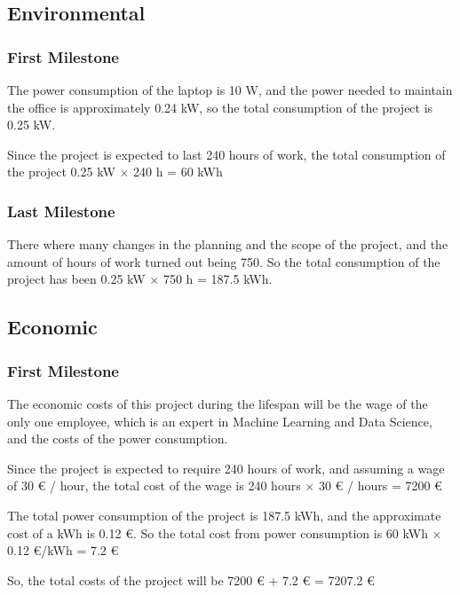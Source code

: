     \subsection{Environmental}
      \subsubsection*{First Milestone}

      The power consumption of the laptop is 10 W, and the power needed to maintain the
      office is approximately 0.24 kW, so the total consumption of the project is
      0.25 kW.

      Since the project is expected to last 240 hours of work, the total consumption of
      the project 0.25 kW $\times$ 240 h = 60 kWh


      \subsubsection*{Last Milestone}

      There where many changes in the planning and the scope of the project,
      and the amount of hours of work turned out being 750. So the total consumption
      of the project has been 0.25 kW $\times$ 750 h = 187.5 kWh.

    \subsection{Economic}
      \subsubsection*{First Milestone}

      The economic costs of this project during the lifespan will be the
      wage of the only one employee, which is an expert in Machine Learning
      and Data Science, and the costs of the power consumption.

      Since the project is expected to require 240 hours of work, and assuming
      a wage of 30 € / hour, the total cost of the wage is
      240 hours $\times$ 30 € / hours = 7200 €

      The total power consumption of the project is 187.5 kWh, and the
      approximate cost of a kWh is 0.12 €. So the total cost from power
      consumption is 60 kWh $\times$ 0.12 €/kWh = 7.2 €

      So, the total costs of the project will be
      7200 € + 7.2 € = 7207.2 €

